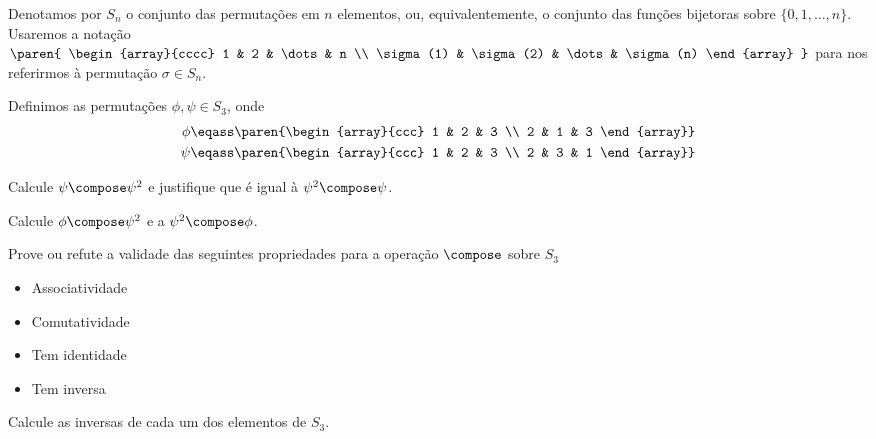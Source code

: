 \begin{definition}
	Denotamos por $S_n$ o conjunto das permutações em $n$ elementos, ou, equivalentemente, o conjunto das funções bijetoras sobre $\{0, 1, \dots, n\}$.
	Usaremos a notação
	$\paren{
		\begin{array}{cccc}
			       1  &        2  & \dots &        n \\
			\sigma(1) & \sigma(2) & \dots & \sigma(n)
		\end{array}
	}$
	para nos referirmos à permutação $\sigma \in S_n$.
\end{definition}

\begin{definition}
	Definimos as permutações $\phi, \psi \in S_3$, onde
	\begin{align*}
		\phi &\eqass \paren{\begin{array}{ccc} 1 & 2 & 3 \\ 2 & 1 & 3 \end{array}} \\
		\psi &\eqass \paren{\begin{array}{ccc} 1 & 2 & 3 \\ 2 & 3 & 1 \end{array}}
	\end{align*}
\end{definition}

\begin{exercise}
	Calcule $\psi \compose \psi^2$ e justifique que é igual à $\psi^2 \compose \psi$.
\end{exercise}

\begin{exercise}
	Calcule $\phi \compose \psi^2$ e a $\psi^2 \compose \phi$.
\end{exercise}

\begin{exercise}
	Prove ou refute a validade das seguintes propriedades para a operação $\compose$ sobre $S_3$
	\begin{itemize}
		\item Associatividade
		\item Comutatividade
		\item Tem identidade
		\item Tem inversa
	\end{itemize}
\end{exercise}

\begin{exercise}
	Calcule as inversas de cada um dos elementos de $S_3$.
\end{exercise}